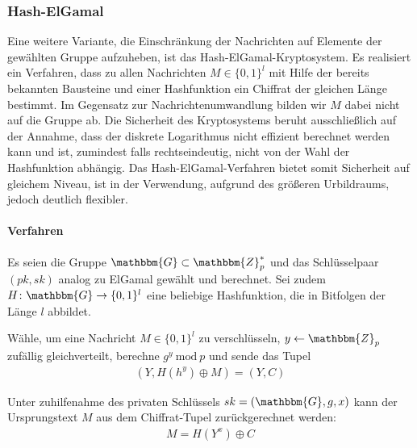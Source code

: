 \subsubsection{Hash-ElGamal}
Eine weitere Variante, die Einschränkung der Nachrichten auf Elemente der gewählten Gruppe aufzuheben, ist das Hash-ElGamal-Kryptosystem. Es realisiert ein Verfahren, dass zu allen Nachrichten $M \in \{0, 1\}^l$ mit Hilfe der bereits bekannten Bausteine und einer Hashfunktion ein Chiffrat der gleichen Länge bestimmt. Im Gegensatz zur Nachrichtenumwandlung bilden wir $M$ dabei nicht auf die Gruppe ab. Die Sicherheit des Kryptosystems beruht ausschließlich auf der Annahme, dass der diskrete Logarithmus nicht effizient berechnet werden kann und ist, zumindest falls rechtseindeutig, nicht von der Wahl der Hashfunktion abhängig. Das Hash-ElGamal-Verfahren bietet somit Sicherheit auf gleichem Niveau, ist in der Verwendung, aufgrund des größeren Urbildraums, jedoch deutlich flexibler.

\paragraph*{Verfahren}
Es seien die Gruppe $\mathbbm{G} \subset \mathbbm{Z}^*_p$ und das Schlüsselpaar $(pk,sk)$ analog zu ElGamal gewählt und berechnet. Sei zudem $H \colon \mathbbm{G} \rightarrow \{0,1\}^l$ eine beliebige Hashfunktion, die in Bitfolgen der Länge $l$ abbildet.

Wähle, um eine Nachricht $M \in \{0,1\}^l$ zu verschlüsseln, $y \leftarrow \mathbbm{Z}_p$ zufällig gleichverteilt, berechne $g^y\ \text{mod}\ p$ und sende das Tupel
\begin{align*}
(Y, H(h^y) \oplus M) = (Y, C)
\end{align*}

Unter zuhilfenahme des privaten Schlüssels $sk = (\mathbbm{G}, g, x)$ kann der Ursprungstext $M$ aus dem Chiffrat-Tupel zurückgerechnet werden:
\begin{align*}
M = H(Y^x) \oplus C
\end{align*}


